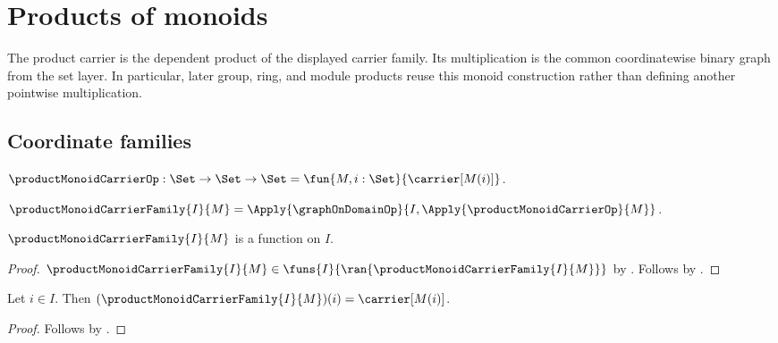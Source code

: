 



\section{Products of monoids}

The product carrier is the dependent product of the displayed carrier family.
Its multiplication is the common coordinatewise binary graph from the set
layer.  In particular, later group, ring, and module products reuse this
monoid construction rather than defining another pointwise multiplication.

\subsection{Coordinate families}

\begin{definition}\label{product_monoid_carrier_op}
    $\productMonoidCarrierOp:\Set\to\Set\to\Set
        =\fun{M,i:\Set}{\carrier[M(i)]}$.
\end{definition}

\begin{definition}\label{product_monoid_carrier_family}
    $\productMonoidCarrierFamily{I}{M}
        =\Apply{\graphOnDomainOp}{
            I,\Apply{\productMonoidCarrierOp}{M}}$.
\end{definition}

\begin{proposition}\label{product_monoid_carrier_family_type}
    $\productMonoidCarrierFamily{I}{M}$ is a function on $I$.
\end{proposition}
\begin{proof}
    $\productMonoidCarrierFamily{I}{M}\in
        \funs{I}{\ran{\productMonoidCarrierFamily{I}{M}}}$ by
        .
    Follows by .
\end{proof}

\begin{proposition}\label{product_monoid_carrier_family_apply}
    Let $i\in I$.
    Then $(\productMonoidCarrierFamily{I}{M})(i)=\carrier[M(i)]$.
\end{proposition}
\begin{proof}
    Follows by
        .
\end{proof}

